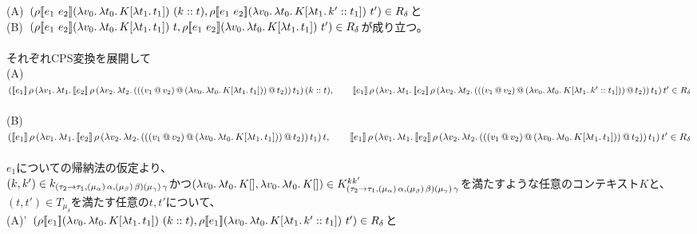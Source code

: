   (A)\ $(\rho \CPSTh{e_1\ e_2} \LamP{v_0}{\Lam{t_0}{K[\Lam{t_1}{t_1}]}}\ (\Cons{k}{t}), \rho \CPSTh{e_1\ e_2} \LamP{v_0}{\Lam{t_0}{K[\Lam{t_1}{\Cons{k'}{t_1}}]}}\ t')\in R_{\delta}$と\\
  (B)\ $(\rho [\![{e_1\ e_2}]\!] (\lambda{v_0}.\,{\lambda{t_0}.\,{K[\lambda{t_1}.\,{t_1}]}})\ t, \rho [\![{e_1\ e_2}]\!] (\lambda{v_0}.\,{\lambda{t_0}.\,{K[\lambda{t_1}.\,{t_1}]}})\ t')\in R_{\delta}$が成り立つ。\\
\\
それぞれCPS変換を展開して\\
  (A)\ $(\CPS{e_1}{\rho}
      {\LamP{v_1}{\Lam{t_1}{\CPS{e_2}{\rho}
            {\LamP{v_2}{\Lam{t_2}
                {\AppP{\AppP{\AppP{v_1}{v_2}}
                    {\LamP{v_0}{\Lam{t_0}
                        {K[\Lam{t_1}{t_1}]}}}}{t_2}}}}{t_1}}}}{(\Cons{k}{t})},\\
      \qquad \CPS{e_1}{\rho}
      {\LamP{v_1}{\Lam{t_1}{\CPS{e_2}{\rho}
            {\LamP{v_2}{\Lam{t_2}
                {\AppP{\AppP{\AppP{v_1}{v_2}}
                    {\LamP{v_0}{\Lam{t_0}
                        {K[\Lam{t_1}{\Cons{k'}{t_1}}]}}}}{t_2}}}}{t_1}}}}{t'}\in R_{\delta}$\\
 \\
  (B)\ $(\CPS{e_1}{\rho}
      {\LamP{v_1}{\Lam{t_1}{\CPS{e_2}{\rho}
            {\LamP{v_2}{\Lam{t_2}
                {\AppP{\AppP{\AppP{v_1}{v_2}}
                    {\LamP{v_0}{\Lam{t_0}
                        {K[\Lam{t_1}{t_1}]}}}}{t_2}}}}{t_1}}}}{t},\\
      \qquad \CPS{e_1}{\rho}
      {\LamP{v_1}{\Lam{t_1}{\CPS{e_2}{\rho}
            {\LamP{v_2}{\Lam{t_2}
                {\AppP{\AppP{\AppP{v_1}{v_2}}
                    {\LamP{v_0}{\Lam{t_0}
                        {K[\Lam{t_1}{t_1}]}}}}{t_2}}}}{t_1}}}}{t'}\in R_{\delta}$\\
      \\
$e_1$についての帰納法の仮定より、\\
$(k,k')\in k_{(\tau_2\rightarrow{\tau_1},(\mu_{\alpha})\,\alpha,(\mu_{\beta})\,\beta) (\mu_{\gamma})\,\gamma}$かつ$(\lambda{v_0}.\,{\lambda{t_0}.\,{K[]}}, \lambda{v_0}.\,{\lambda{t_0}.\,{K[]}})\in  K^{kk'}_{(\tau_2\rightarrow{\tau_1},(\mu_{\alpha})\,\alpha,(\mu_{\beta})\,\beta) (\mu_{\gamma})\,\gamma}$を満たすような任意のコンテキスト$K$と、$(t, t') \in T_{\mu_{\delta}}$を満たす任意の$t, t'$について、\\
  (A)'\ $(\rho [\![{e_1}]\!] (\lambda{v_0}.\,{\lambda{t_0}.\,{K[\lambda{t_1}.\,{t_1}]}})\ (k::t), \rho [\![{e_1}]\!] (\lambda{v_0}.\,{\lambda{t_0}.\,{K[\lambda{t_1}.\,{k'::t_1}]}})\ t')\in R_{\delta}$と\\
